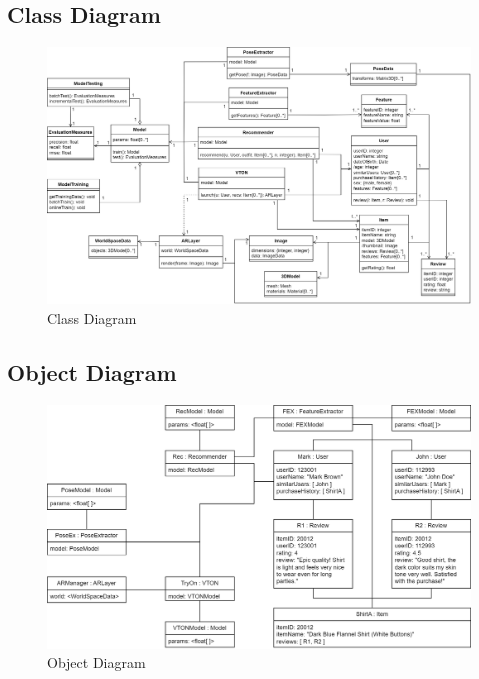 	\subsection{Class Diagram}
		\begin{figure}[h!]
			\includegraphics[width=\textwidth]{components/images/class.png}
			\caption{Class Diagram}
			\label{fig:class}
		\end{figure}

	\pagebreak

	\subsection{Object Diagram}
		\begin{figure}[h!]
			\includegraphics[width=\textwidth]{components/images/object.png}
			\caption{Object Diagram}
			\label{fig:object}
		\end{figure}

